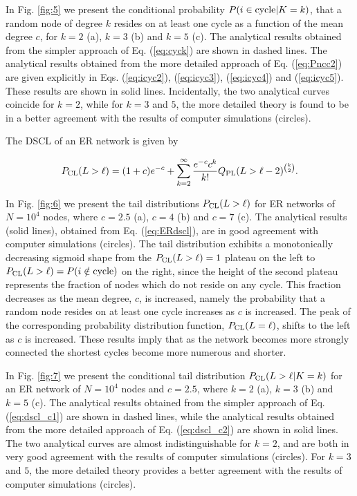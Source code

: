 \documentclass[preprint,pre,superscriptaddress,showpacs]{revtex4}
\begin{document}
In Fig. \ref{fig:5} 
we present the conditional probability
$P(i \in {\rm cycle} |K= k)$, 
that a random node of degree $k$ resides on at least one cycle
as a function of the mean degree $c$,
for $k=2$ (a), $k=3$ (b) and $k=5$ (c).
The analytical results 
obtained from the
simpler approach of
Eq. (\ref{eq:cyck}) are shown in dashed lines.
The analytical results obtained from 
the more detailed approach of
Eq. (\ref{eq:Pncc2}) 
are given explicitly in Eqs. 
(\ref{eq:icyc2}), (\ref{eq:icyc3}),
(\ref{eq:icyc4}) and (\ref{eq:icyc5}).
These results are shown in solid lines.
Incidentally, the two analytical curves coincide for $k=2$,
while for $k=3$ and $5$, the more detailed theory is found to
be in a better agreement with the
results of computer simulations (circles).

The DSCL of an ER network is given by

\begin{equation}
P_{\rm CL}(L>\ell) = (1+c) e^{-c} 
+ \sum_{k=2}^{\infty} \frac{e^{-c} c^k}{k!} {Q}_{\rm PL}(L>\ell-2)^{\binom{k}{2}}.
\label{eq:ERdscl}
\end{equation}

In Fig. \ref{fig:6} we present the
tail distributions 
$P_{\rm CL}(L>\ell)$
for ER networks of $N=10^{4}$ nodes,
where $c=2.5$ (a), $c=4$ (b) and $c=7$ (c).
The analytical results (solid lines), 
obtained from Eq. (\ref{eq:ERdscl}),
are in good agreement with computer 
simulations (circles).
The tail distribution exhibits a monotonically decreasing sigmoid shape
from the $P_{\rm CL}(L>\ell)=1$ plateau on the left to 
$P_{\rm CL}(L>\ell)=P(i \notin {\rm cycle})$ on the right,
since the
height of the second plateau represents the fraction of nodes
which do not reside on any cycle.
This fraction decreases as the mean degree, $c$, is increased,
namely the probability that a random node resides on at least one
cycle increases as $c$ is increased.
The peak of the corresponding probability distribution function,
$P_{\rm CL}(L=\ell)$,
shifts to the left as $c$ is increased.
These results imply that as the network becomes more strongly 
connected the shortest cycles become more numerous and shorter.


In Fig. \ref{fig:7} we present the conditional tail distribution
$P_{\rm CL}(L>\ell |K= k)$
for an ER network of $N=10^4$ nodes and $c=2.5$,
where $k=2$ (a), $k=3$ (b) and $k=5$ (c).
The analytical results 
obtained from the
simpler approach of
Eq. (\ref{eq:dscl_c1}) 
are shown in dashed lines,
while the analytical results obtained from 
the more detailed approach of
Eq. (\ref{eq:dscl_c2}) are
shown in solid lines.
The two analytical curves are almost indistinguishable for $k=2$,
and are both in very good agreement with the results of 
computer simulations (circles).
For $k=3$ and $5$, the more detailed theory provides a
better agreement with the
results of computer simulations (circles).
\end{document}

